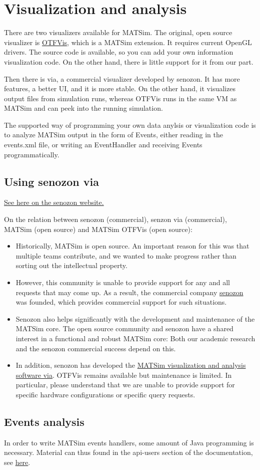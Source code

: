 \chapter{Visualization and analysis}

There are two visualizers available for MATSim. The original, open source visualizer is \href{http://matsim.org/docs/extensions/otfvis}{OTFVis},  which is a MATSim extension. It requires current OpenGL drivers. The  source code is available, so you can add your own information  visualization code. On the other hand, there is little support for it  from our part.

Then there is via, a commercial visualizer developed by senozon. It  has more features, a better UI, and it is more stable. On the other  hand, it visualizes output files from simulation runs, whereas OTFVis  runs in the same VM as MATSim and can peek into the running simulation.

The supported way of programming your own data anylsis or  visualization code is to analyze MATSim output in the form of Events,  either reading in the events.xml file, or writing an EventHandler and  receiving Events programmatically.

\vfill\eject
\section{Using senozon via}



\href{http://senozon.com/products/via}{See here on the senozon website.}



On the relation between senozon (commercial), senzon via (commercial), MATSim (open source) and MATSim OTFVis (open source):
\begin{itemize}
	\item Historically, MATSim is open source. An important reason  for this was that multiple teams contribute, and we wanted to make  progress rather than sorting out the intellectual property.
	\item However, this community is unable to provide support for any and all  requests that may come up. As a result, the commercial company \href{http://www.senzon.com/}{senozon} was founded, which provides commercial support for such situations.
	\item Senozon also helps significantly with the development and  maintenance of the MATSim core. The open source community and senozon  have a shared interest in a functional and robust MATSim core: Both our  academic research and the senozon commercial success depend on this.
	\item In addition, senozon has developed the \href{http://senozon.com/products/via}{MATSim visualization and analysis software via}.  OTFVis remains available but maintenance is limited. In  particular, please understand that we are unable to provide support for  specific hardware configurations or specific query requests.
\end{itemize}

\vfill\eject
\section{Events analysis}

In  order to write MATSim events handlers, some amount of Java programming  is necessary. Material can thus found in the api-users section of  the documentation, see \href{http://www.matsim.org/node/17}{here}.
